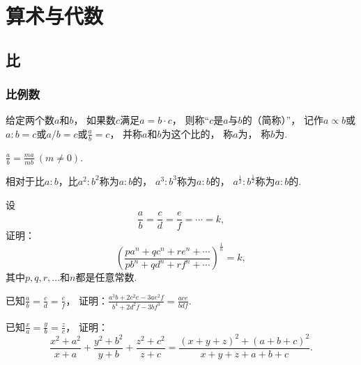 \chapter{算术与代数}

\section{比}
\subsection{比例数}
\begin{definition}
给定两个数\(a\)和\(b\)，
如果数\(c\)满足\(a=b \cdot c\)，
则称“\(c\)是\(a\)与\(b\)的（简称）”，
记作\(a \propto b\)或\(a:b=c\)或\(a/b=c\)或\(\frac{a}{b}=c\)，
并称\(a\)和\(b\)为这个比的，
称\(a\)为，
称\(b\)为.
\end{definition}

\begin{property}
\(\frac{a}{b} = \frac{ma}{mb}\ (m\neq0)\).
\end{property}

\begin{definition}
相对于比\(a:b\)，比\(a^2:b^2\)称为\(a:b\)的，
\(a^3:b^3\)称为\(a:b\)的，
\(a^{\frac{1}{2}}:b^{\frac{1}{2}}\)称为\(a:b\)的.
\end{definition}

\begin{example}
设\[
	\frac{a}{b} = \frac{c}{d} = \frac{e}{f} = \dotsb = k,
\]
证明：\[
	\left(
		\frac{
			p a^n + q c^n + r e^n + \dotsb
		}{
			p b^n + q d^n + r f^n + \dotsb
		}
	\right)^{\frac1n} = k,
\]
其中\(p,q,r,\dotsc\)和\(n\)都是任意常数.
\end{example}

\begin{example}
已知\(\frac{a}{b}=\frac{c}{d}=\frac{e}{f}\)，
证明：\(\frac{a^3b+2c^2e-3ae^2f}{b^4+2d^2f-3bf^3} = \frac{ace}{bdf}\).
\end{example}

\begin{example}
已知\(\frac{x}{a}=\frac{y}{b}=\frac{z}{c}\)，
证明：\[
	\frac{x^2+a^2}{x+a}+\frac{y^2+b^2}{y+b}+\frac{z^2+c^2}{z+c}
	= \frac{(x+y+z)^2+(a+b+c)^2}{x+y+z+a+b+c}.
\]
\end{example}

